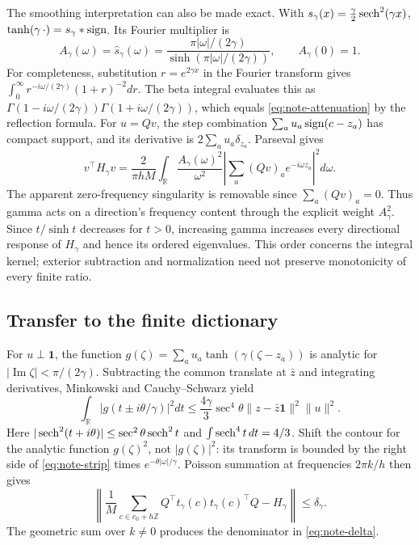 The smoothing interpretation can also be made exact. With
$s_\gamma(x)=\frac\gamma2\operatorname{sech}^2(\gamma x)$,
$\tanh(\gamma\,\cdot)=s_\gamma*\operatorname{sign}$. Its Fourier multiplier is
\begin{equation}
 A_\gamma(\omega)=\widehat s_\gamma(\omega)
 =\frac{\pi|\omega|/(2\gamma)}{\sinh(\pi|\omega|/(2\gamma))},
 \qquad A_\gamma(0)=1.
 \label{eq:note-attenuation}
\end{equation}
For completeness, substitution $r=e^{2\gamma x}$ in the Fourier transform
gives $\int_0^\infty r^{-i\omega/(2\gamma)}(1+r)^{-2}dr$.
The beta integral evaluates this as
$\Gamma(1-i\omega/(2\gamma))\Gamma(1+i\omega/(2\gamma))$,
which equals \eqref{eq:note-attenuation} by the reflection formula.
For $u=Qv$, the step combination $\sum_a u_a\operatorname{sign}(c-z_a)$ has compact
support, and its derivative is $2\sum_a u_a\delta_{z_a}$. Parseval gives
\begin{equation}
 v^\top H_\gamma v=\frac2{\pi hM}\int_{\mathbb R}
 \frac{A_\gamma(\omega)^2}{\omega^2}
 \left|\sum_a(Qv)_a e^{-i\omega z_a}\right|^2d\omega.
 \label{eq:note-directional-filter}
\end{equation}
The apparent zero-frequency singularity is removable since $\sum_a(Qv)_a=0$.
Thus gamma acts on a direction's frequency content through the explicit
weight $A_\gamma^2$. Since $t/\sinh t$ decreases for $t>0$, increasing gamma
increases every directional response of $H_\gamma$ and hence its ordered
eigenvalues. This order concerns the integral kernel; exterior subtraction
and normalization need not preserve monotonicity of every finite ratio.

\subsection{Transfer to the finite dictionary}
For $u\perp\mathbf1$, the function
$g(\zeta)=\sum_a u_a\tanh(\gamma(\zeta-z_a))$ is analytic for
$|\operatorname{Im}\zeta|<\pi/(2\gamma)$.
Subtracting the common translate at $\bar z$ and integrating derivatives,
Minkowski and Cauchy--Schwarz yield
\begin{equation}
 \int_{\mathbb R}|g(t\pm i\theta/\gamma)|^2dt
 \le\frac{4\gamma}{3}\sec^4\theta
 \|z-\bar z\mathbf1\|^2\|u\|^2.
 \label{eq:note-strip}
\end{equation}
Here $|\operatorname{sech}^2(t+i\theta)|\le\sec^2\theta\operatorname{sech}^2t$ and
$\int\operatorname{sech}^4t\,dt=4/3$. Shift the contour for the analytic function
$g(\zeta)^2$, not $|g(\zeta)|^2$: its transform is bounded by the
right side of \eqref{eq:note-strip} times $e^{-\theta|\omega|/\gamma}$.
Poisson summation at frequencies $2\pi k/h$ then gives
\begin{equation}
 \left\|\frac1M\sum_{c\in c_0+h\mathbb Z}
 Q^\top t_\gamma(c)t_\gamma(c)^\top Q-H_\gamma\right\|
 \le\delta_\gamma.
\end{equation}
The geometric sum over $k\ne0$ produces the denominator in
\eqref{eq:note-delta}.

